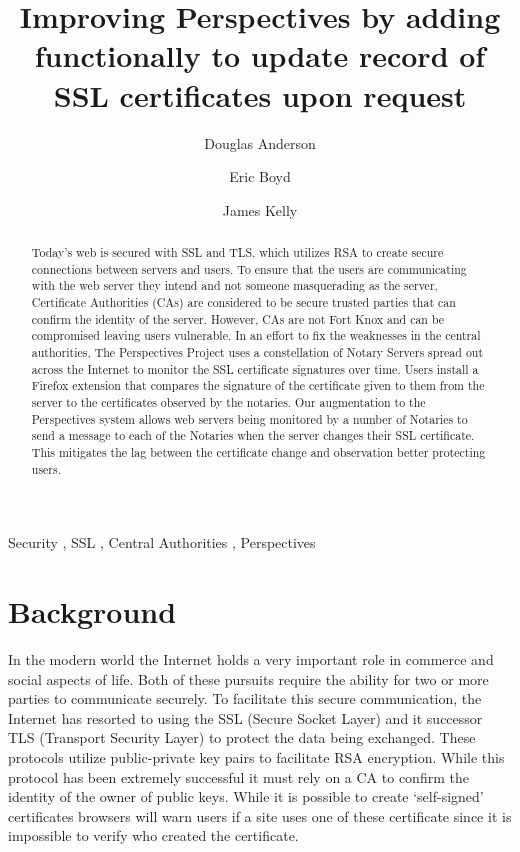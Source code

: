 \documentclass[preprint,review,12pt]{elsarticle}
\begin{document}
\begin{frontmatter}

\title{Improving Perspectives by adding functionally to update record of SSL certificates upon request}

\author[doug]{Douglas Anderson}
\author[eric]{Eric Boyd}
\author[james]{James Kelly}
\address[doug]{dander01@uoguelph.ca}
\address[eric]{boyde@uoguelph.ca}
\address[james]{kellyj@uoguelph.ca}


\begin{abstract}

Today's web is secured with SSL and TLS, which utilizes RSA to create secure
connections between servers and users. To ensure that the users are
communicating with the web server they intend and not someone masquerading as
the server, Certificate Authorities (CAs) are considered to be secure trusted
parties that can confirm the identity of the server. However, CAs are not Fort
Knox and can be compromised leaving users vulnerable. In an effort to fix the
weaknesses in the central authorities, The Perspectives Project uses a
constellation of Notary Servers spread out across the Internet to monitor the
SSL certificate signatures over time. Users install a Firefox extension that
compares the signature of the certificate given to them from the server to the
certificates observed by the notaries. Our augmentation to the Perspectives
system allows web servers being monitored by a number of Notaries to send a
message to each of the Notaries when the server changes their SSL certificate.
This mitigates the lag between the certificate change and observation better
protecting users.

\end{abstract}

\begin{keyword}
Security \sep
SSL \sep
Central Authorities \sep
Perspectives
\end{keyword}

\end{frontmatter}

\section{Background}
\label{background}

In the modern world the Internet holds a very important role in commerce and
social aspects of life. Both of these pursuits require the ability for two or
more parties to communicate securely. To facilitate this secure communication,
the Internet has resorted to using the SSL (Secure Socket Layer) and it
successor TLS (Transport Security Layer) to protect the data being exchanged.
These protocols utilize public-private key pairs to facilitate RSA encryption.
While this protocol has been extremely successful it must rely on a CA to
confirm the identity of the owner of public keys. While it is possible to
create `self-signed' certificates browsers will warn users if a site uses one
of these certificate since it is impossible to verify who created the
certificate. 
\end{document}
